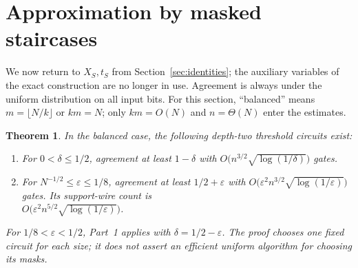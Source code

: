 \documentclass[11pt]{article}
\newtheorem{theorem}{Theorem}[section]
\begin{document}
\section{Approximation by masked staircases}\label{sec:approx}
We now return to $X_S,t_S$ from Section~\ref{sec:identities}; the auxiliary
variables of the exact construction are no longer in use. Agreement is
always under the uniform distribution on all input bits. For this section,
``balanced'' means $m=\lfloor N/k\rfloor$ or $km=N$; only $km=O(N)$ and
$n=\Theta(N)$ enter the estimates.
\begin{theorem}\label{thm:avgupper}
In the balanced case, the following depth-two threshold circuits exist:
\begin{enumerate}
\item For $0<\delta\le1/2$, agreement at least $1-\delta$ with
      $O\bigl(n^{3/2}\sqrt{\log(1/\delta)}\bigr)$ gates.
\item For $N^{-1/2}\le\varepsilon\le1/8$, agreement at least
      $1/2+\varepsilon$ with
      $O\bigl(\varepsilon^2n^{3/2}\sqrt{\log(1/\varepsilon)}\bigr)$ gates. Its support-wire count is\\
      $O\bigl(\varepsilon^2n^{5/2}\sqrt{\log(1/\varepsilon)}\bigr)$.
\end{enumerate}
For $1/8<\varepsilon<1/2$, Part~1 applies with $\delta=1/2-\varepsilon$.
The proof chooses one fixed circuit for each size; it does not assert an
efficient uniform algorithm for choosing its masks.
\end{theorem}
\end{document}

